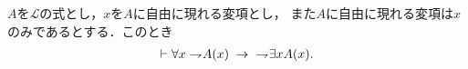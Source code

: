	\begin{comment}
		必要に応じて$A$を$\lang{\varepsilon}$の式に書き換えたものを$\widehat{A}$とする．
		存在記号の推論公理より
		\begin{align}
			\vdash\ \negation A(\varepsilon x \negation \widehat{A}(x)) \rarrow \exists x \negation A(x)
		\end{align}
		が成り立つので，対偶を取って
		\begin{align}
			\vdash\ \negation \exists x \negation A(x) \rarrow\ \negation\negation A(\varepsilon x \negation \widehat{A}(x))
		\end{align}
		が従い(論理的定理\ref{logicalthm:introduction_of_contraposition})，演繹定理の逆より
		\begin{align}
			\negation \exists x \negation A(x) \vdash\ \negation\negation A(\varepsilon x \negation \widehat{A}(x))
		\end{align}
		となる．そして二重否定の除去より
		\begin{align}
			\negation \exists x \negation A(x) \vdash A(\varepsilon x \negation \widehat{A}(x))
		\end{align}
		が成立し，全称の導出(論理的定理\ref{derivation_of_universal_by_epsilon})より
		\begin{align}
			\negation \exists x \negation A(x) \vdash \forall x A(x)
		\end{align}
		が従う．演繹定理より
		\begin{align}
			\vdash\ \negation \exists x \negation A(x) \rarrow \forall x A(x)
		\end{align}
		となり，対偶を取れば
		\begin{align}
			\vdash\ \negation \forall x A(x) \rarrow\ \negation\negation \exists x \negation A(x)
		\end{align}
		となるが，先と同様に二重否定の除去によって
		\begin{align}
			\vdash\ \negation \forall x A(x) \rarrow \exists x \negation A(x)
		\end{align}
		が得られる．
		\QED
	\end{comment}
	
	\begin{screen}
		\begin{logicalthm}
		\label{logicalthm:strong_De_Morgan_law_for_quantifiers_1}
			$A$を$\mathcal{L}$の式とし，$x$を$A$に自由に現れる変項とし，
			また$A$に自由に現れる変項は$x$のみであるとする．このとき
			\begin{align}
				\vdash \forall x \rightharpoondown\hspace{-0.25em} A(x) \hspace{0.25em}\rightarrow\hspace{0.25em}\ \rightharpoondown\hspace{-0.25em} \exists x A(x).
			\end{align}
		\end{logicalthm}
	\end{screen}
	
